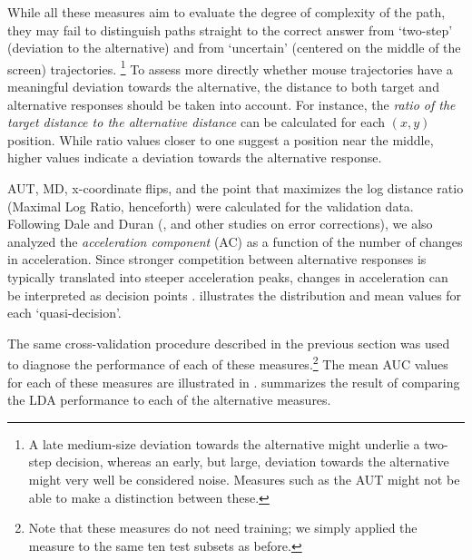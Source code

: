 \documentclass[draft]{article}
\newcommand{\addMM}[1]{{\leavevmode\color{green}#1}}
\begin{document}
While all these measures aim to evaluate the degree of complexity of the path, they may fail to distinguish paths straight to the correct answer from `two-step' (deviation to the alternative) and from `uncertain' (centered on the middle of the screen) trajectories.%
%
\footnote{A late medium-size deviation towards the alternative might underlie a two-step decision, whereas an early, but large, deviation towards the alternative might very well be considered noise. Measures such as the AUT might not be able to make a distinction between these.} 
To assess more directly whether mouse trajectories have a meaningful deviation towards the alternative, the distance to both target and alternative responses should be taken into account. 
For instance, the \textit{ratio of the target distance to the alternative distance} can be calculated for each $(x,y)$ position. While ratio values closer to one suggest a position near the middle, higher values indicate a deviation towards the alternative response. 

AUT, MD, x-coordinate flips, and the point that maximizes the log distance ratio (Maximal Log Ratio, henceforth) were calculated for the validation data. 
Following Dale and Duran (\citeyear{Dale2011}, and other studies on error corrections), we also analyzed the \emph{acceleration component} (AC) as a function of the number of changes in acceleration.
Since stronger competition between alternative responses is typically translated into steeper acceleration peaks, changes in acceleration can be interpreted as decision points \citep{Hehman2014}.   
 illustrates the distribution and mean values for each `quasi-decision'.

The same cross-validation procedure described in the previous section was used to diagnose the performance of each of these measures.\footnote{Note that these measures do not need training; we simply applied the measure to the same ten test subsets as before.} The mean AUC values for each of these measures are illustrated in .  summarizes the result of comparing the LDA performance to each of the alternative measures. 
\end{document}

